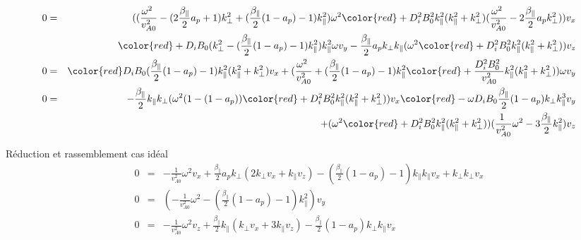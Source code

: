 \begin{eqnarray}
0 &=& ((\frac{\omega^2 }{v^2_{A0}}   - (2\frac{\beta_{\parallel}}{2} a_p +1) k^2_{\perp} +  (\frac{\beta_{\parallel}}{2}  (1 - a_p) -1) k^2_{\parallel}) \omega ^2  {\color{red}+ D^2_i B^2_0k^2_{\parallel} (k^2_{\parallel} + k^2_{\perp}) (\frac{ \omega ^2 }{v^2_{A0}} - 2\frac{\beta_{\parallel}}{2} a_p  k^2_{\perp})}    )   v_x \nonumber\\
&& {\color{red}  + D_i B_0  (  k^2_{\perp}    - (\frac{\beta_{\parallel}}{2}  (1 - a_p) -1)   k^2_{\parallel} )k^2_{\parallel}\omega v_y  }  -\frac{\beta_{\parallel}}{2} a_p k_{\perp}k_{\parallel}  (\omega^2  {\color{red} + D^2_i B^2_0 k^2_{\parallel} (k^2_{\parallel} + k^2_{\perp}) } ) v_z  \nonumber\\
 0 &=& {\color{red} D_i B_0  (\frac{\beta_{\parallel}}{2}  (1 - a_p) -1)k^2_{\parallel}   (k^2_{\parallel} + k^2_{\perp}) v_x} + ( \frac{\omega^2 }{v^2_{A0}} + (\frac{\beta_{\parallel}}{2}  (1 - a_p) -1)k^2_{\parallel} {\color{red} + \frac{D^2_i B^2_0 }{v^2_{A0}}  k^2_{\parallel} (k^2_{\parallel} + k^2_{\perp}) }    )\omega v_y \nonumber\\
 0 &=&  - \frac{\beta_{\parallel}}{2} k_{\parallel} k_{\perp} (  \omega^2 (1  -  (1 - a_p)) {\color{red} + D^2_i B^2_0 k^2_{\parallel} (k^2_{\parallel} + k^2_{\perp}) } ) v_x   {\color{red} -\omega D_i B_0  \frac{\beta_{\parallel}}{2}  (1 - a_p) k_{\perp}  k^3_{\parallel} v_y  }\nonumber \\
 && + (\omega^2  {\color{red} + D^2_i B^2_0 k^2_{\parallel} (k^2_{\parallel} + k^2_{\perp}) } )(\frac{1 }{v^2_{A0}} \omega^2 - 3 \frac{\beta_{\parallel}}{2} k^2_{\parallel}) v_z\nonumber 
\end{eqnarray}


Réduction et rassemblement cas idéal
\begin{eqnarray}
 0 &=& - \frac{1 }{v^2_{A0}}\omega^2 v_x + \frac{\beta_{\parallel}}{2} a_p k_{\perp}(2k_{\perp} v_x +k_{\parallel} v_z)  - (\frac{\beta_{\parallel}}{2}  (1 - a_p) -1) k_{\parallel} k_{\parallel} v_x +k_{\perp}k_{\perp} v_x  \nonumber\\
 0 &=& (- \frac{1 }{v^2_{A0}} \omega^2   - (\frac{\beta_{\parallel}}{2}  (1 - a_p) -1)k^2_{\parallel} ) v_y  \nonumber \\
 0 &=& - \frac{1 }{v^2_{A0}} \omega^2 v_z  +\frac{\beta_{\parallel}}{2} k_{\parallel} (k_{\perp} v_x + 3 k_{\parallel} v_z) - \frac{\beta_{\parallel}}{2}  (1 - a_p) k_{\perp} k_{\parallel} v_x    \nonumber
\end{eqnarray}

